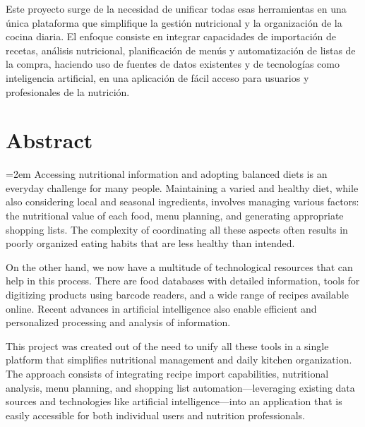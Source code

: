 \documentclass{article}
\begin{document}
Este proyecto surge de la necesidad de unificar todas esas herramientas en una única plataforma que simplifique la gestión nutricional y la organización de la cocina diaria. El enfoque consiste en integrar capacidades de importación de recetas, análisis nutricional, planificación de menús y automatización de listas de la compra, haciendo uso de fuentes de datos existentes y de tecnologías como inteligencia artificial, en una aplicación de fácil acceso para usuarios y profesionales de la nutrición.

\newpage

\section*{Abstract}
\begingroup
{}
\emergencystretch=2em
Accessing nutritional information and adopting balanced diets is an everyday challenge for many people. Maintaining a varied and healthy diet, while also considering local and seasonal ingredients, involves managing various factors: the nutritional value of each food, menu planning, and generating appropriate shopping lists. The complexity of coordinating all these aspects often results in poorly organized eating habits that are less healthy than intended.

On the other hand, we now have a multitude of technological resources that can help in this process. There are food databases with detailed information, tools for digitizing products using barcode readers, and a wide range of recipes available online. Recent advances in artificial intelligence also enable efficient and personalized processing and analysis of information.

This project was created out of the need to unify all these tools in a single platform that simplifies nutritional management and daily kitchen organization. The approach consists of integrating recipe import capabilities, nutritional analysis, menu planning, and shopping list automation—leveraging existing data sources and technologies like artificial intelligence—into an application that is easily accessible for both individual users and nutrition professionals.
\par
\endgroup
{}

\newpage
\renewcommand{\contentsname}{Índice}
\tableofcontents

\newpage


\newpage


\newpage


\newpage


\newpage


\newpage


\newpage


\newpage

\end{document}
